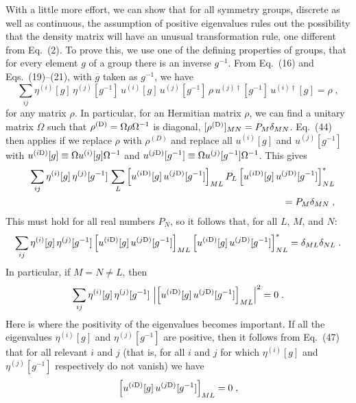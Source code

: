 With a little more effort, we can show that for all symmetry groups, discrete as well as continuous, the assumption of positive eigenvalues rules out the possibility that the density matrix will have an unusual transformation rule, one different from Eq.~(2).   To prove this, we use one of the defining properties of groups, that for every element $g$ of a group there is an inverse $g^{-1}$.  From Eq.~(16) and Eqs.~(19)--(21), with $\overline{g}$ taken as $g^{-1}$, we have
\begin{equation}
\sum_{ij}\eta^{(i)}[g]\,\eta^{(j)}[g^{-1}]\,u^{(i)}[g]\,u^{(j)}[g^{-1}]\,\rho\,u^{(j)\dagger}[g^{-1}]\, u^{(i)\dagger}[g]=\rho\;,
\end{equation}
for any   matrix $\rho$.  In particular, for an Hermitian matrix $\rho$, we can find a unitary matrix $\Omega$ such that $\rho^{({\rm D})}=\Omega\rho\Omega^{-1}$ is  diagonal, $[\rho^{({\rm D})}]_{MN}=P_M\delta_{MN}$.  Eq.~(44) then applies if we replace $\rho$ with $\rho^{(D)}$ and replace all $u^{(i)}[g]$ and $u^{(j)}[g^{-1}]$ with $u^{(i{\rm D})}[g]\equiv \Omega u^{(i)}[g] \Omega^{-1}$ and $u^{(j{\rm D})}[g^{-1}]\equiv \Omega u^{(j)}[g^{-1}]\Omega^{-1}$.  This gives
\begin{eqnarray}
&&\sum_{ij}\eta^{(i)}[g]\,\eta^{(j)}[g^{-1}]\,\sum_L\Big[u^{(i{\rm D})}[g]\,u^{(j{\rm D})}[g^{-1}]\Big]_{ML}\,P_L\,\Big[u^{(i{\rm D})}[g]\,u^{(j{\rm D})}[g^{-1}] \Big]_{NL}^*\nonumber\\&&~~~~~~~~~~~=P_M\delta_{MN}\;,
\end{eqnarray}
This must hold for all real numbers $P_N$, so it follows that, for all $L$, $M$, and $N$:
\begin{equation}
\sum_{ij}\eta^{(i)}[g]\,\eta^{(j)}[g^{-1}]\,\Big[u^{(i{\rm D})}[g]\,u^{(j{\rm D})}[g^{-1}]\Big]_{ML}\,\Big[u^{(i{\rm D})}[g]\,u^{(j{\rm D})}[g^{-1}] \Big]_{NL}^*=\delta_{ML}\delta_{NL}\;.
\end{equation}
In particular, if $M=N\neq L$, then 
\begin{equation}
\sum_{ij}\eta^{(i)}[g]\,\eta^{(j)}[g^{-1}]\,\left|\Big[u^{(i{\rm D})}[g]\,u^{(j{\rm D})}[g^{-1}]\Big]_{ML}\right|^2=0\;.
\end{equation}
Here is where the positivity of the eigenvalues becomes important.  If all the eigenvalues 
$\eta^{(i)}[g]$ and $\eta^{(j)}[g^{-1}]$ are positive, then it follows from Eq.~(47) that for all relevant $i$ and $j$ (that is, for all $i$ and $j$ for which $\eta^{(i)}[g]$ and $\eta^{(j)}[g^{-1}]$ respectively do not vanish) we have
\begin{equation}
\Big[u^{(i{\rm D})}[g]\,u^{(j{\rm D})}[g^{-1}]\Big]_{ML}=0\;,
\end{equation}
